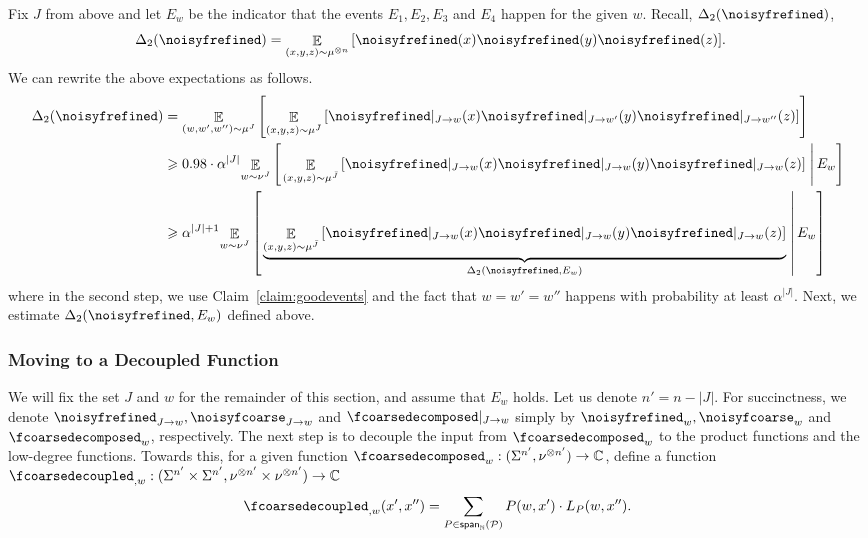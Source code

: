 \documentclass[11pt]{article}
\newcommand\cExpect[3]{{\mathop{\mathbb{E}}_{#1}\left[ \left. #3 \;\right\vert #2 \right]}}
\newcommand\Expect[2]{{\mathop{\mathbb{E}}_{#1}\left[ {#2} \right]}}
\newcommand\spn{{\sf span}_{\mathbb{N}}}
\renewcommand\geq{\geqslant}
\newcommand{\V}[1]{{#1}}
\begin{document}
    Fix $J$ from above and let $E_{\V w}$ be the indicator that the events $E_1 , E_2, E_3 $ and $E_4$ happen for the given $\V w$. Recall, $\Delta_2(\noisyfrefined)$,
    \begin{align*}
    \Delta_2(\noisyfrefined) &=\Expect{(\V x, \V y, \V z)\sim \mu^{\otimes n}}{\noisyfrefined(\V x) \noisyfrefined(\V y) \noisyfrefined(\V z)}.
    \end{align*}
%
We can rewrite the above expectations as follows.
    \begin{align*}
     \Delta_2(\noisyfrefined) &=  \Expect{(\V w, \V w', \V w'') \sim \mu^{J}}{\Expect{(\V x, \V y, \V z)\sim \mu^{\bar{J}}}{\noisyfrefined|_{J\rightarrow \V w}(\V x) \noisyfrefined|_{J\rightarrow \V w'}(\V y) \noisyfrefined|_{J\rightarrow \V w''}(\V z)}}\\
     & \geq 0.98\cdot \alpha^{|J|} \cExpect{w\sim\nu^{J}}{E_w}{\Expect{(\V x, \V y, \V z)\sim \mu^{\bar{J}}}{\noisyfrefined|_{J\rightarrow \V w}(\V x) \noisyfrefined|_{J\rightarrow \V w}(\V y) \noisyfrefined|_{J\rightarrow \V w}(\V z)}}\\
       & \geq \alpha^{|J|+1} \cExpect{w\sim\nu^{J}}{E_w}{\underbrace{\Expect{(\V x, \V y, \V z)\sim \mu^{\bar{J}}}{\noisyfrefined|_{J\rightarrow \V w}(\V x) \noisyfrefined|_{J\rightarrow \V w}(\V y) \noisyfrefined|_{J\rightarrow \V w}(\V z)}}_{\Delta_2(\noisyfrefined, E_{\V w}) }}\\
    \end{align*}
   where in the second step, we use Claim~\ref{claim:goodevents} and the fact that $\V w = \V w' = \V w''$ happens with probability at least $\alpha^{|J|}$.  Next, we estimate $\Delta_2(\noisyfrefined, E_{\V w})$ defined above.
   
\subsubsection{Moving to a Decoupled Function}
\label{sec:move_to_decoulped}
We will fix the set $J$ and $\V w$ for the remainder of this section, and assume that $E_w$ holds.  Let us denote $n' = n-|J|$. For succinctness, we denote $\noisyfrefined_{J\rightarrow\V w}, \noisyfcoarse_{J\rightarrow\V w}$ and $\fcoarsedecomposed|_{J\rightarrow \V w}$ simply by $\noisyfrefined_{\V w}, \noisyfcoarse_{\V w}$ and $\fcoarsedecomposed_{\V w}$, respectively. The next step is to decouple the input from $\fcoarsedecomposed_{\V w}$ to the product functions and the low-degree functions. Towards this, for a given function $\fcoarsedecomposed_{\V w} : (\Sigma^{n'}, \nu^{\otimes n'}) \rightarrow \mathbb{C}$, define a function $\fcoarsedecoupled_{,\V w}: (\Sigma^{n'}\times \Sigma^{n'},  \nu^{\otimes n'}\times  \nu^{\otimes n'}) \rightarrow \mathbb{C}$
$$\fcoarsedecoupled_{, \V w}(\V x', \V x'') = \sum\limits_{P\in\spn(\mathcal{P})} P(\V w, \V x') \cdot L_P(\V w, \V x'').$$
\end{document}
